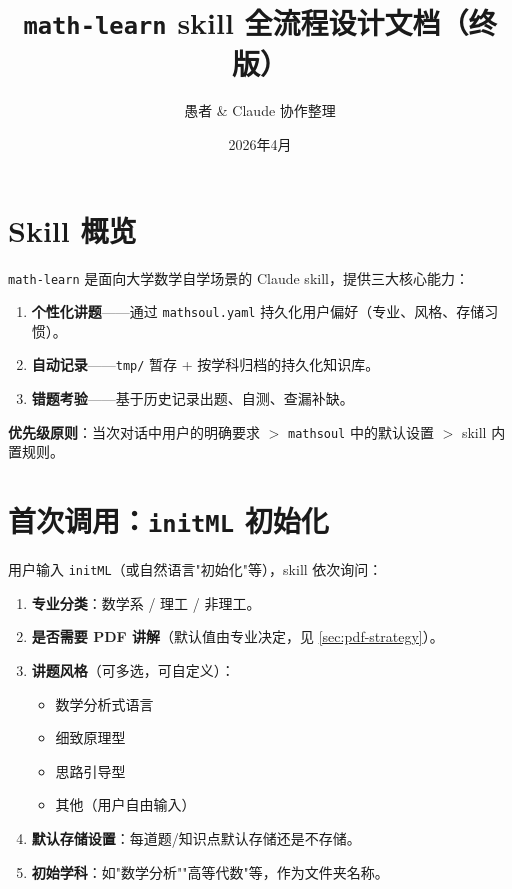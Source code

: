\documentclass[12pt,a4paper]{ctexart}
\title{\texttt{math-learn} skill 全流程设计文档（终版）}
\author{愚者 \& Claude 协作整理}
\date{2026年4月}
\begin{document}
\maketitle
\tableofcontents
\newpage

\section{Skill 概览}

\texttt{math-learn} 是面向大学数学自学场景的 Claude skill，提供三大核心能力：
\begin{enumerate}[label=(\arabic*)]
  \item \textbf{个性化讲题}——通过 \texttt{mathsoul.yaml} 持久化用户偏好（专业、风格、存储习惯）。
  \item \textbf{自动记录}——\texttt{tmp/} 暂存 + 按学科归档的持久化知识库。
  \item \textbf{错题考验}——基于历史记录出题、自测、查漏补缺。
\end{enumerate}

\textbf{优先级原则}：当次对话中用户的明确要求 $>$ \texttt{mathsoul} 中的默认设置 $>$ skill 内置规则。

\section{首次调用：\texttt{initML} 初始化}

用户输入 \texttt{initML}（或自然语言"初始化"等），skill 依次询问：

\begin{enumerate}[label=\arabic*.]
  \item \textbf{专业分类}：数学系 / 理工 / 非理工。
  \item \textbf{是否需要 PDF 讲解}（默认值由专业决定，见 \ref{sec:pdf-strategy}）。
  \item \textbf{讲题风格}（可多选，可自定义）：
    \begin{itemize}
      \item 数学分析式语言
      \item 细致原理型
      \item 思路引导型
      \item 其他（用户自由输入）
    \end{itemize}
  \item \textbf{默认存储设置}：每道题/知识点默认存储还是不存储。
  \item \textbf{初始学科}：如"数学分析""高等代数"等，作为文件夹名称。
\end{enumerate}
\end{document}
